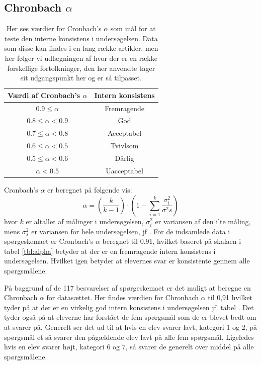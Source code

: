 \subsection*{Chronbach $\alpha$}
\begin{table}[h!]
	\centering
	\caption[Chronbach's $\alpha$ værdier]{Her ses værdier for Cronbach's $\alpha$ som mål for at teste den interne konsistens i undersøgelsen. Data som disse kan findes i en lang række artikler, men her følger vi udlægningen af \citep[Tabel 1, s. 382]{Peterson1994} hvor der er en række forskellige fortolkninger, den her anvendte tager sit udgangspunkt her og er så tilpasset.}
	\label{tbl:alpha}
	\begin{tabular}{@{ } c c @{ }}
		\toprule[2.pt]
		Værdi af Cronbach's $\alpha$ & Intern konsistens\\
		\midrule
		$0.9\leq \alpha$ 		& Fremragende\\
		$0.8\leq \alpha < 0.9$ 	& God\\
		$0.7\leq \alpha < 0.8$	& Acceptabel\\
		$0.6\leq \alpha < 0.5$	& Tvivlsom\\
		$0.5\leq \alpha < 0.6$ 	& Dårlig\\
		$\alpha < 0.5$			& Uacceptabel\\
		\bottomrule[2pt]
	\end{tabular}
\end{table}
Cronbach's  $\alpha$ er beregnet på følgende vis: 
\begin{equation}\label{eq:alpha}
	\alpha = \left(\frac{k}{k-1}\right)\cdot \left(1-\sum_{i=1}^{k} \frac{\sigma^{2}_{i}}{\sigma^{2}{s}}\right)
\end{equation}
hvor $k$ er altallet af målinger i undersøgelsen, $\sigma^{2}_{i}$ er variansen af den i'te måling, mens $\sigma^{2}_{s}$ er variansen for hele undersøgelsen, jf \cite[s.382]{Peterson1994}. For de indsamlede data i spørgeskemaet er Cronbach's $\alpha$ beregnet til 0.91, hvilket baseret på skalaen i tabel \vref{tbl:alpha} betyder at der er en fremragende intern konsistens i undersøgelsen. Hvilket igen betyder at elevernes svar er konsistente gennem alle spørgsmålene. 

På baggrund af de 117 besvarelser af spørgeskemaet er det muligt at beregne en Chronbach $\alpha$ for datasættet. Her findes værdien for Chronbach $\alpha$ til 0,91 hvilket tyder på at der er en virkelig god intern konsistens i undersøgelsen jf. tabel . Det tyder også på at eleverne har forstået de fem spørgsmål som de er blevet bedt om at svarer på.  Generelt ser det ud til at hvis en elev svarer lavt, kategori 1 og 2, på spørgsmål et så svarer den pågældende elev lavt på alle fem spørgsmål. Ligeledes hvis en elev svarer højt, kategori 6 og 7, så svarer de generelt over middel på alle spørgsmålene.

